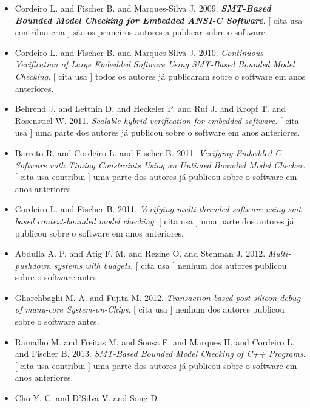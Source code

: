 \begin{itemize}
\item Cordeiro L. and Fischer B. and Marques-Silva J.
      2009.
        \textbf{\textit{ SMT-Based Bounded Model Checking for Embedded ANSI-C Software}}.
      [
          cita
          usa
          contribui
          cria
      ]
são os primeiros autores a publicar sobre o software.
\item Cordeiro L. and Fischer B. and Marques-Silva J.
      2010.
        \textit{ Continuous Verification of Large Embedded Software Using SMT-Based Bounded Model Checking}.
      [
          cita
          usa
      ]
todos os autores já publicaram sobre o software em anos anteriores.
\item Behrend J. and Lettnin D. and Heckeler P. and Ruf J. and Kropf T. and Rosenstiel W.
      2011.
        \textit{ Scalable hybrid verification for embedded software}.
      [
          cita
          usa
      ]
uma parte dos autores já publicou sobre o software em anos anteriores.
\item Barreto R. and Cordeiro L. and Fischer B.
      2011.
        \textit{ Verifying Embedded C Software with Timing Constraints Using an Untimed Bounded Model Checker}.
      [
          cita
          usa
          contribui
      ]
uma parte dos autores já publicou sobre o software em anos anteriores.
\item Cordeiro L. and Fischer B.
      2011.
        \textit{ Verifying multi-threaded software using smt-based context-bounded model checking}.
      [
          cita
          usa
      ]
uma parte dos autores já publicou sobre o software em anos anteriores.
\item Abdulla A. P. and Atig F. M. and Rezine O. and Stenman J.
      2012.
        \textit{ Multi-pushdown systems with budgets}.
      [
          cita
          usa
      ]
nenhum dos autores publicou sobre o software antes.
\item Gharehbaghi M. A. and Fujita M.
      2012.
        \textit{ Transaction-based post-silicon debug of many-core System-on-Chips}.
      [
          cita
          usa
      ]
nenhum dos autores publicou sobre o software antes.
\item Ramalho M. and Freitas M. and Sousa F. and Marques H. and Cordeiro L. and Fischer B.
      2013.
        \textit{ SMT-Based Bounded Model Checking of C++ Programs}.
      [
          cita
          usa
          contribui
      ]
uma parte dos autores já publicou sobre o software em anos anteriores.
\item Cho Y. C. and D'Silva V. and Song D.

\end{itemize}
